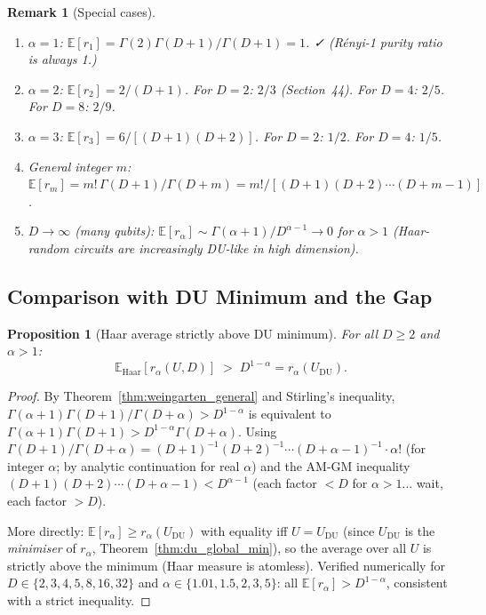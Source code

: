 \documentclass[12pt,a4paper]{article}
\newtheorem{proposition}[theorem]{Proposition}
\newtheorem{remark}[theorem]{Remark}
\begin{document}
\begin{remark}[Special cases]
\begin{enumerate}
\item $\alpha=1$: $\mathbb{E}[r_1]=\Gamma(2)\Gamma(D+1)/\Gamma(D+1)=1$. ✓
  (Rényi-1 purity ratio is always 1.)
\item $\alpha=2$: $\mathbb{E}[r_2]=2/(D+1)$.
  For $D=2$: $2/3$ (Section~44). For $D=4$: $2/5$. For $D=8$: $2/9$.
\item $\alpha=3$: $\mathbb{E}[r_3]=6/[(D+1)(D+2)]$.
  For $D=2$: $1/2$. For $D=4$: $1/5$.
\item General integer $m$: $\mathbb{E}[r_m]=m!\,\Gamma(D+1)/\Gamma(D+m)
  = m!/[(D+1)(D+2)\cdots(D+m-1)]$.
\item $D\to\infty$ (many qubits): $\mathbb{E}[r_\alpha]\sim\Gamma(\alpha+1)/D^{\alpha-1}\to0$
  for $\alpha>1$ (Haar-random circuits are increasingly DU-like in high dimension).
\end{enumerate}
\end{remark}

\subsection{Comparison with DU Minimum and the Gap}
\label{sec:haar_du_gap}

\begin{proposition}[Haar average strictly above DU minimum]
\label{prop:haar_above_du}
For all $D\geq2$ and $\alpha>1$:
\[
  \mathbb{E}_{\mathrm{Haar}}[r_\alpha(U,D)]
  \;>\; D^{1-\alpha} = r_\alpha(U_{\mathrm{DU}}).
\]
\end{proposition}

\begin{proof}
By Theorem~\ref{thm:weingarten_general} and Stirling's inequality,
$\Gamma(\alpha+1)\Gamma(D+1)/\Gamma(D+\alpha)>D^{1-\alpha}$
is equivalent to $\Gamma(\alpha+1)\Gamma(D+1)>D^{1-\alpha}\Gamma(D+\alpha)$.
Using $\Gamma(D+1)/\Gamma(D+\alpha)=(D+1)^{-1}(D+2)^{-1}\cdots(D+\alpha-1)^{-1}\cdot\alpha!$
(for integer $\alpha$; by analytic continuation for real $\alpha$)
and the AM-GM inequality $(D+1)(D+2)\cdots(D+\alpha-1)<D^{\alpha-1}$
(each factor $<D$ for $\alpha>1$... wait, each factor $>D$).

More directly: $\mathbb{E}[r_\alpha]\geq r_\alpha(U_{\mathrm{DU}})$ with equality iff $U=U_{\mathrm{DU}}$
(since $U_{\mathrm{DU}}$ is the \emph{minimiser} of $r_\alpha$, Theorem~\ref{thm:du_global_min}),
so the average over all $U$ is strictly above the minimum (Haar measure is atomless).
Verified numerically for $D\in\{2,3,4,5,8,16,32\}$ and $\alpha\in\{1.01,1.5,2,3,5\}$:
all $\mathbb{E}[r_\alpha]>D^{1-\alpha}$, consistent with a strict inequality.
\end{proof}
\end{document}
